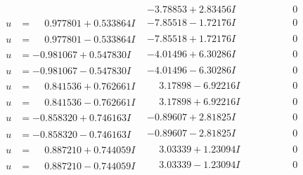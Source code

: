 \documentclass[1p]{elsarticle_modified}
\theoremstyle{definition}
\begin{document}
$$\begin{array}{c|c|c}
 & -3.78853 + 2.83456 I & \phantom{-0.000000 } 0 \\ \hline\begin{aligned}
u &= \phantom{-}0.977801 + 0.533864 I\end{aligned}
 & -7.85518 - 1.72176 I & \phantom{-0.000000 } 0 \\ \hline\begin{aligned}
u &= \phantom{-}0.977801 - 0.533864 I\end{aligned}
 & -7.85518 + 1.72176 I & \phantom{-0.000000 } 0 \\ \hline\begin{aligned}
u &= -0.981067 + 0.547830 I\end{aligned}
 & -4.01496 + 6.30286 I & \phantom{-0.000000 } 0 \\ \hline\begin{aligned}
u &= -0.981067 - 0.547830 I\end{aligned}
 & -4.01496 - 6.30286 I & \phantom{-0.000000 } 0 \\ \hline\begin{aligned}
u &= \phantom{-}0.841536 + 0.762661 I\end{aligned}
 & \phantom{-}3.17898 - 6.92216 I & \phantom{-0.000000 } 0 \\ \hline\begin{aligned}
u &= \phantom{-}0.841536 - 0.762661 I\end{aligned}
 & \phantom{-}3.17898 + 6.92216 I & \phantom{-0.000000 } 0 \\ \hline\begin{aligned}
u &= -0.858320 + 0.746163 I\end{aligned}
 & -0.89607 + 2.81825 I & \phantom{-0.000000 } 0 \\ \hline\begin{aligned}
u &= -0.858320 - 0.746163 I\end{aligned}
 & -0.89607 - 2.81825 I & \phantom{-0.000000 } 0 \\ \hline\begin{aligned}
u &= \phantom{-}0.887210 + 0.744059 I\end{aligned}
 & \phantom{-}3.03339 + 1.23094 I & \phantom{-0.000000 } 0 \\ \hline\begin{aligned}
u &= \phantom{-}0.887210 - 0.744059 I\end{aligned}
 & \phantom{-}3.03339 - 1.23094 I & \phantom{-0.000000 } 0 \\ \hline\begin{aligned}

\end{aligned}
\end{array}$$
\end{document}
